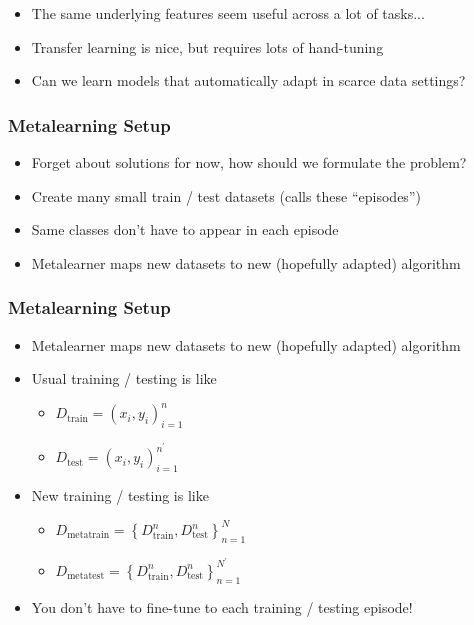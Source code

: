 \documentclass[10pt,mathserif]{beamer}
\begin{document}
\begin{frame}
  \begin{itemize}\itemsep=12pt
  \item The same underlying features seem useful across a lot of tasks...
  \item Transfer learning is nice, but requires lots of hand-tuning
  \item Can we learn models that automatically adapt in scarce data settings?
  \end{itemize}
\end{frame}

\begin{frame}
  \frametitle{Metalearning Setup}
  \begin{itemize}\itemsep=12pt
    \item Forget about solutions for now, how should we formulate the problem?
    \item Create many small train / test datasets (calls these ``episodes'')
    \item Same classes don't have to appear in each episode
    \item Metalearner maps new datasets to new (hopefully adapted) algorithm
  \end{itemize}
\end{frame}

\begin{frame}
  \frametitle{Metalearning Setup}
  \begin{itemize}\itemsep=12pt
    \item Metalearner maps new datasets to new (hopefully adapted) algorithm
    \item Usual training / testing is like
      \begin{itemize}
        \item $D_{\text{train}} = \left(x_i, y_i\right)_{i = 1}^{n}$
        \item $D_{\text{test}} = \left(x_i, y_i\right)_{i = 1}^{n^\prime}$
      \end{itemize}
    \item New training / testing is like
      \begin{itemize}
      \item $D_{\text{metatrain}} = \left\{D_{\text{train}}^{n}, D_{\text{test}}^{n}\right\}_{n = 1}^{N}$
      \item $D_{\text{metatest}} = \left\{D_{\text{train}}^{n}, D_{\text{test}}^{n}\right\}_{n = 1}^{N^\prime}$
      \end{itemize}
    \item You don't have to fine-tune to each training / testing episode!
  \end{itemize}
\end{frame}
\end{document}

